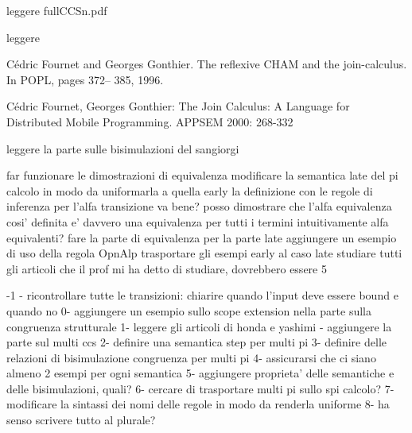 
leggere fullCCSn.pdf

leggere 

Cédric Fournet and Georges Gonthier. The reflexive
CHAM and the join-calculus. In POPL, pages 372–
385, 1996.

Cédric Fournet, Georges Gonthier: The Join Calculus:
A Language for Distributed Mobile Programming.
APPSEM 2000: 268-332



leggere la parte sulle bisimulazioni del sangiorgi



















far funzionare le dimostrazioni di equivalenza
modificare la semantica late del pi calcolo in modo da uniformarla a quella early
la definizione con le regole di inferenza per l'alfa transizione va bene? posso dimostrare che l'alfa equivalenza cosi' definita e' davvero una equivalenza per tutti i termini intuitivamente alfa equivalenti?
fare la parte di equivalenza per la parte late
aggiungere un esempio di uso della regola OpnAlp
trasportare gli esempi early al caso late
studiare tutti gli articoli che il prof mi ha detto di studiare, dovrebbero essere 5



-1 - ricontrollare tutte le transizioni: chiarire quando l'input deve essere bound e quando no
0- aggiungere un esempio sullo scope extension nella parte sulla congruenza strutturale
1- leggere gli articoli di honda e yashimi
 - aggiungere la parte sul multi ccs
2- definire una semantica step per multi pi
3- definire delle relazioni di bisimulazione congruenza per multi pi
4- assicurarsi che ci siano almeno 2 esempi per ogni semantica
5- aggiungere proprieta' delle semantiche e delle bisimulazioni, quali?
6- cercare di trasportare multi pi sullo spi calcolo?
7- modificare la sintassi dei nomi delle regole in modo da renderla uniforme
8- ha senso scrivere tutto al plurale?


